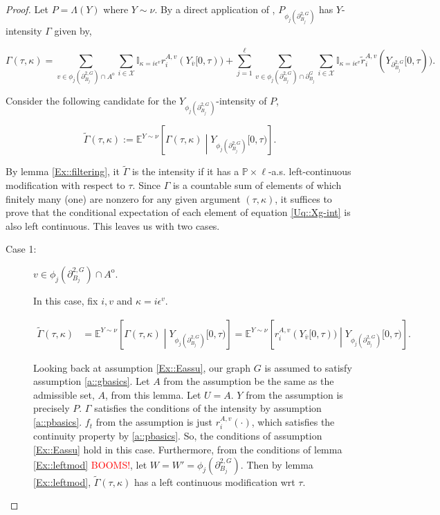 \documentclass[12pt]{article}
\newcommand{\mb}{\mathbb}
\newcommand{\mc}{\mathcal}
\newcommand{\ov}{\overline}
\newcommand{\ep}{\epsilon}
\newcommand{\tr}{\textcolor{red}}
\newcommand{\pr}{\mb{P}}							%
\newcommand{\exmu}[2]{\mb{E}^{#1}\left[#2\right]}	%
\newcommand{\defeq}{:=}								%
\newcommand{\sta}{\mc{X}}							%
\newcommand{\gneigh}[2]{\partial^{#1}_{#2}}			%
\newcommand{\dgneigh}[2]{\partial^{2,#1}_{#2}}		%
\newcommand{\cl}[1]{\ov{#1}}						%
\newcommand{\Sm}{\ell}								%
\newcommand{\rate}{r}								%
\newcommand{\vind}[1]{_{#1}}						%
\newcommand{\tmi}[1]{#1}							%
\newcommand{\stpara}[1]{_{#1}}						%
\newcommand{\gvpara}[2]{^{#1,#2}}					%
\newcommand{\psize}{\ell}							%
\newcommand{\Xg}{Y}									%
\newcommand{\brate}{\alt{\rate}}					%
\newcommand{\inte}[1]{{#1}^\mathrm{o}}				%
\newcommand{\alt}[1]{\tilde{#1}}					%
\newcommand{\pmap}{\Lambda}							%
\newcommand{\rt}{\tau}								%
\renewcommand{\mark}{\kappa}						%
\newcommand{\ratee}{\Gamma}							%
\newcommand{\cratee}{\alt{\ratee}}					%
\newcommand{\rp}{P}									%
\newcommand{\mm}{\nu}								%
\newcommand{\ev}[1]{\ep^{#1}}						%
\begin{document}
\begin{proof}

Let \(\rp = \pmap(\Xg)\) where \(\Xg \sim \mm\). By a direct application of \cite[Exercise 14.7.1]{DalVer08}, \(\rp\vind{\phi_j(\dgneigh{G}{B_j})}\) has \(\Xg\)-intensity \(\ratee\) given by,

\begin{equation}
\ratee(\rt,\mark) = \sum_{v \in\phi_j(\dgneigh{G}{B_j})\cap\inte{A}} \sum_{i \in \sta} \mb{I}_{\mark = i\ev{v}} \rate\gvpara{A}{v}\stpara{i}(\Xg\vind{\cl{v}}\tmi{[0,\rt)}) + \sum_{j = 1}^\psize\sum_{v \in \phi_j(\dgneigh{G}{B_j})\cap\gneigh{G}{B_j}}\sum_{i\in \sta} \mb{I}_{\mark = i\ev{v}} \brate\gvpara{A}{v}\stpara{i}(\Xg\vind{\dgneigh{G}{B_j}}\tmi{[0,\rt)}).
\label{Uq::Xg-int}
\end{equation}

Consider the following candidate for the \(\Xg\vind{\phi_j(\dgneigh{G}{B_j})}\)-intensity of \(\rp\), 

\[\cratee(\rt,\mark) \defeq \exmu{\Xg \sim \mm}{\ratee(\rt,\mark)\middle|\Xg\vind{\phi_j(\dgneigh{G}{B_j})}\tmi{[0,\rt)}}.\]

By lemma \ref{Ex::filtering}, it \(\cratee\) is the intensity if it has a \(\pr\times\Sm\)-a.s. left-continuous modification with respect to \(\rt\). Since \(\ratee\) is a countable sum of elements of which finitely many (one) are nonzero for any given argument \((\rt,\mark)\), it suffices to prove that the conditional expectation of each element of equation \eqref{Uq::Xg-int} is also left continuous. This leaves us with two cases.

\begin{description}
\item[Case 1: ] \(v \in \phi_j(\dgneigh{G}{B_j})\cap\inte{A}\).

In this case, fix \(i,v\) and \(\mark = i\ev{v}\).

\begin{align*}
\cratee(\rt,\mark) &= \exmu{\Xg\sim\mm}{\ratee(\rt,\mark)\middle|\Xg\vind{\phi_j(\dgneigh{G}{B_j})}\tmi{[0,\rt)}} = \exmu{\Xg\sim\mm}{\rate\gvpara{A}{v}\stpara{i}(\Xg\vind{\cl{v}}\tmi{[0,\rt)})\middle|\Xg\vind{\phi_j(\dgneigh{G}{B_j})}\tmi{[0,\rt)}}.
\end{align*}

Looking back at assumption \ref{Ex::Eassu}, our graph \(G\) is assumed to satisfy assumption \ref{a::gbasics}. Let \(A\) from the assumption be the same as the admissible set, \(A\), from this lemma. Let \(U = A\). \(\Xg\) from the assumption is precisely \(\rp\). \(\ratee\) satisfies the conditions of the intensity by assumption \ref{a::pbasics}. \(f_t\) from the assumption is just \(\rate\gvpara{A}{v}\stpara{i}(\cdot)\), which satisfies the continuity property by \ref{a::pbasics}. So, the conditions of assumption \ref{Ex::Eassu} hold in this case. Furthermore, from the conditions of lemma \ref{Ex::leftmod} \tr{BOOMS!}, let \(W = W' = \phi_j(\dgneigh{G}{B_j})\). Then by lemma \ref{Ex::leftmod}, \(\cratee(\rt,\mark)\) has a left continuous modification wrt \(\rt\).


\end{description}
\end{proof}
\end{document}
